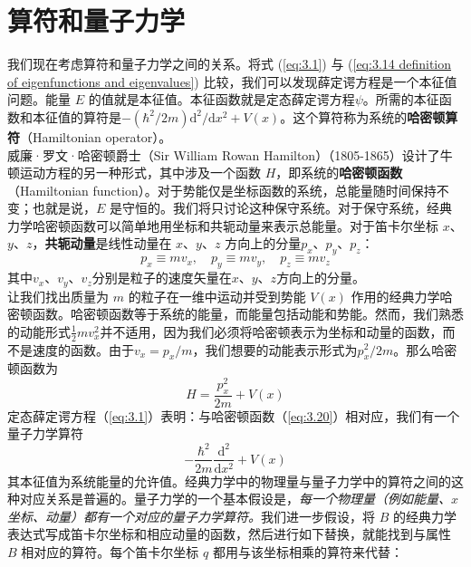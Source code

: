 \section{算符和量子力学}
\label{sec:3.3 Operators and Quantum Mechanics}
	我们现在考虑算符和量子力学之间的关系。将式 (\ref{eq:3.1}) 与 (\ref{eq:3.14 definition of eigenfunctions and eigenvalues}) 比较，我们可以发现薛定谔方程是一个本征值问题。能量 $E$ 的值就是本征值。本征函数就是定态薛定谔方程$\psi$。所需的本征函数和本征值的算符是$-\left(\hbar^2/2m\right)\mathrm{d}^2/\mathrm{d}x^2+V\left(x\right)$。这个算符称为系统的\textbf{哈密顿算符}（Hamiltonian operator）。\\
	\indent 威廉·罗文·哈密顿爵士（Sir William Rowan Hamilton）（1805-1865）设计了牛顿运动方程的另一种形式，其中涉及一个函数 $H$，即系统的\textbf{哈密顿函数}（Hamiltonian function）。对于势能仅是坐标函数的系统，总能量随时间保持不变；也就是说，$E$ 是守恒的。我们将只讨论这种保守系统。对于保守系统，经典力学哈密顿函数可以简单地用坐标和共轭动量来表示总能量。对于笛卡尔坐标 $x$、$y$、$z$，\textbf{共轭动量}是线性动量在 $x$、$y$、$z$ 方向上的分量$p_x$、$p_y$、$p_z$：
	\begin{equation}
		\boxed{
			p_x \equiv mv_x, \quad p_y \equiv mv_y, \quad p_z \equiv mv_z
		}
		\label{eq:3.19}
	\end{equation}
	其中$v_x$、$v_y$、$v_z$分别是粒子的速度矢量在$x$、$y$、$z$方向上的分量。\\
	\indent 让我们找出质量为 $m$ 的粒子在一维中运动并受到势能 $V\left(x\right)$ 作用的经典力学哈密顿函数。哈密顿函数等于系统的能量，而能量包括动能和势能。然而，我们熟悉的动能形式$\frac{1}{2}mv_x^2$并不适用，因为我们必须将哈密顿表示为坐标和动量的函数，而不是速度的函数。由于$v_x = p_x/m$，我们想要的动能表示形式为$p_x^2/2m$。那么哈密顿函数为
	\begin{equation}
		H = \frac{p_x^2}{2m}+V\left(x\right)
		\label{eq:3.20}
	\end{equation}
	\indent 定态薛定谔方程（\ref{eq:3.1}）表明：与哈密顿函数（\ref{eq:3.20}）相对应，我们有一个量子力学算符
	\begin{equation*}
		-\frac{\hbar^2}{2m}\frac{\mathrm{d}^2}{\mathrm{d}x^2}+V\left(x\right)
	\end{equation*}
	其本征值为系统能量的允许值。经典力学中的物理量与量子力学中的算符之间的这种对应关系是普遍的。量子力学的一个基本假设是，\textit{每一个物理量（例如能量、$x$ 坐标、动量）都有一个对应的量子力学算符。}我们进一步假设，将 $B$ 的经典力学表达式写成笛卡尔坐标和相应动量的函数，然后进行如下替换，就能找到与属性 $B$ 相对应的算符。每个笛卡尔坐标 $q$ 都用与该坐标相乘的算符来代替：
